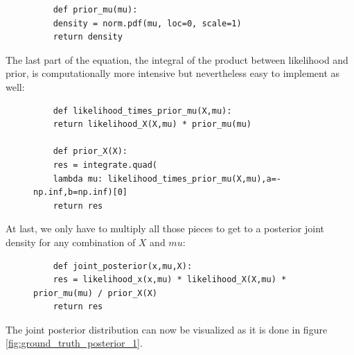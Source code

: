 \documentclass{article}
\begin{document}
\begin{figure}[H]
	\begin{lstlisting}
	def prior_mu(mu):
	density = norm.pdf(mu, loc=0, scale=1)
	return density
	\end{lstlisting}
	\label{fig:prior_mu}
\end{figure}
The last part of the equation, the integral of the product between likelihood and prior, is computationally more intensive but nevertheless easy to implement as well:
\begin{figure}[H]
	\begin{lstlisting}
	def likelihood_times_prior_mu(X,mu):
	return likelihood_X(X,mu) * prior_mu(mu)
	
	def prior_X(X):
	res = integrate.quad(
	lambda mu: likelihood_times_prior_mu(X,mu),a=-np.inf,b=np.inf)[0]
	return res
	\end{lstlisting}
	\label{fig:prior_X}
\end{figure}
At last, we only have to multiply all those pieces to get to a posterior joint density for any combination of $X$ and $mu$:
\begin{figure}[H]
	\begin{lstlisting}
	def joint_posterior(x,mu,X):
	res = likelihood_x(x,mu) * likelihood_X(X,mu) * prior_mu(mu) / prior_X(X)
	return res
	\end{lstlisting}
	\label{fig:joint_posterior}
\end{figure}
The joint posterior distribution can now be visualized as it is done in figure \ref{fig:ground_truth_posterior_1}.
\end{document}
